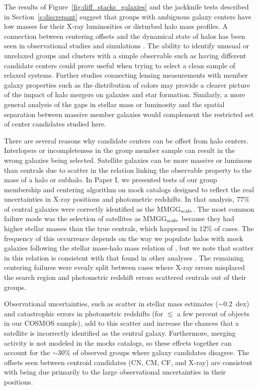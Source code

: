 \documentclass[12pt]{emulateapj}
\begin{document}
The results of Figure~\ref{fig:diff_stacks_galaxies} and the jackknife
tests described in Section~\ref{s:discrepant} suggest that groups with
ambiguous galaxy centers have low masses for their X-ray
  luminosities or disturbed halo mass profiles. A
connection between centering offsets and the dynamical state of halos
has been seen in observational studies \citep[e.g.,][]{Forman1982,
  Katayama2003, Sanderson2009} and simulations
\citep[e.g.,][]{Cohn2005, Poole2006, Maccio2007, Neto2007,
  SkibbaMaccio2011}. The ability to identify unusual
  or unrelaxed groups and
clusters with a simple observable such as having different candidate
centers could prove useful when trying to select a clean sample of
relaxed systems. Further studies connecting lensing measurements with
member galaxy properties such as the distribution of colors may
provide a clearer picture of the impact of halo mergers on galaxies
and star formation. Similarly, a more general analysis of the gaps in
stellar mass or luminosity and the spatial separation between massive
member galaxies would complement the restricted set of center
candidates studied here.

There are several reasons why candidate centers can be offset from
halo centers. Interlopers or incompleteness in the group member sample
can result in the wrong galaxies being selected. Satellite galaxies
can be more massive or luminous than centrals due to scatter in the
relation linking the observable property to the mass of a halo or
subhalo. In Paper I, we presented tests of our group membership and
centering algorithm on mock catalogs designed to reflect the real
uncertainties in X-ray positions and photometric redshifts. In that
analysis, $77\%$ of central galaxies were correctly identified as the
MMGG$_{\rm scale}$.  The most common failure mode was the selection of
satellites as MMGG$_{\rm scale}$ because they had higher stellar
masses than the true centrals, which happened in $12\%$ of
cases. The frequency of this occurrence depends on the
  way we populate halos with mock galaxies following the stellar
  mass-halo mass relation of \citet{Leauthaud2012}, but we note that
  scatter in this relation is consistent with that found in other
  analyses \citep{Yang2009, More2009, Reddick2012}. The remaining
centering failures were evenly split between cases where X-ray errors
misplaced the search region and photometric redshift errors scattered
centrals out of their groups.

Observational uncertainties, such as scatter in stellar mass estimates
($\sim0.2$~{\rm dex}) and catastrophic errors in photometric redshifts
(for $\lesssim$ a few percent of objects in our COSMOS sample), add to
this scatter and increase the chances that a satellite is incorrectly
identified as the central galaxy. Furthermore, merging activity is not
modeled in the mocks catalogs, so these effects together can account
for the $\sim30\%$ of observed groups where galaxy candidates
disagree. The offsets seen between centroid candidates (CN, CM, CF,
and X-ray) are consistent with being due primarily to the large
observational uncertainties in their positions.
\end{document}
